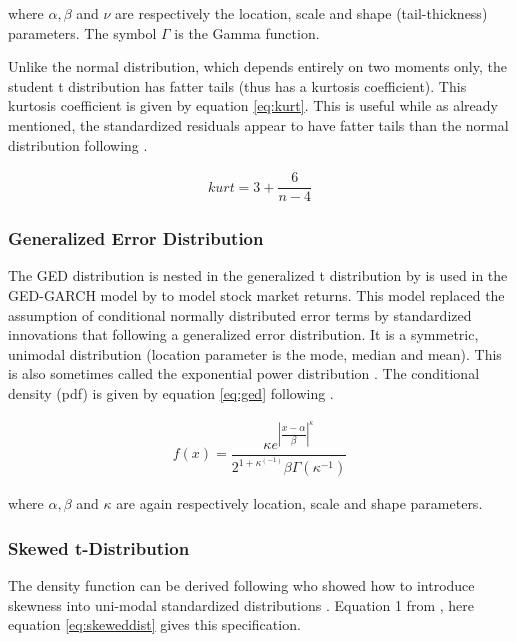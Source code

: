 \documentclass[a4paper, twoside]{templates/ociamthesis}
\begin{document}
where \(\alpha, \beta\) and \(\nu\) are respectively the location, scale and shape (tail-thickness) parameters. The symbol \(\Gamma\) is the Gamma function.

Unlike the normal distribution, which depends entirely on two moments only, the student t distribution has fatter tails (thus has a kurtosis coefficient). This kurtosis coefficient is given by equation \eqref{eq:kurt}. This is useful while as already mentioned, the standardized residuals appear to have fatter tails than the normal distribution following \textcite{bollerslev2008}.

\begin{align}
kurt = 3 + \dfrac{6}{n-4}
 \label{eq:kurt}
\end{align}

\hypertarget{generalized-error-distribution}{%
\subsubsection{Generalized Error Distribution}\label{generalized-error-distribution}}

The GED distribution is nested in the generalized t distribution by \textcite{mcdonald1988} is used in the GED-GARCH model by \textcite{nelson1991} to model stock market returns. This model replaced the assumption of conditional normally distributed error terms by standardized innovations that following a generalized error distribution. It is a symmetric, unimodal distribution (location parameter is the mode, median and mean). This is also sometimes called the exponential power distribution \autocite{bollerslev2008}. The conditional density (pdf) is given by equation \eqref{eq:ged} following \textcite{ghalanos2020}.

\begin{align}
f(x) = \dfrac{\kappa e^{\left|\dfrac{x-\alpha}{\beta}\right|^\kappa}}{2^{1+\kappa^(-1)}\beta\Gamma(\kappa^{-1})}
 \label{eq:ged}
\end{align}

where \(\alpha, \beta\) and \(\kappa\) are again respectively location, scale and shape parameters.

\hypertarget{skewed-t-distribution}{%
\subsubsection{Skewed t-Distribution}\label{skewed-t-distribution}}

The density function can be derived following \textcite{fernández1998} who showed how to introduce skewness into uni-modal standardized distributions \autocite{trottier2015}. Equation 1 from \textcite{trottier2015}, here equation \eqref{eq:skeweddist} gives this specification.
\end{document}

